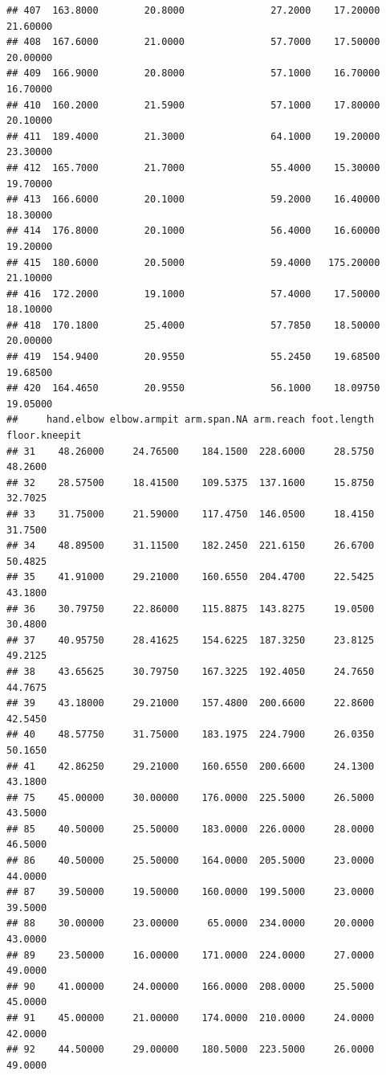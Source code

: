\documentclass[]{article}
\begin{document}
\begin{verbatim}
## 407  163.8000        20.8000               27.2000    17.20000   21.60000
## 408  167.6000        21.0000               57.7000    17.50000   20.00000
## 409  166.9000        20.8000               57.1000    16.70000   16.70000
## 410  160.2000        21.5900               57.1000    17.80000   20.10000
## 411  189.4000        21.3000               64.1000    19.20000   23.30000
## 412  165.7000        21.7000               55.4000    15.30000   19.70000
## 413  166.6000        20.1000               59.2000    16.40000   18.30000
## 414  176.8000        20.1000               56.4000    16.60000   19.20000
## 415  180.6000        20.5000               59.4000   175.20000   21.10000
## 416  172.2000        19.1000               57.4000    17.50000   18.10000
## 418  170.1800        25.4000               57.7850    18.50000   20.00000
## 419  154.9400        20.9550               55.2450    19.68500   19.68500
## 420  164.4650        20.9550               56.1000    18.09750   19.05000
##     hand.elbow elbow.armpit arm.span.NA arm.reach foot.length floor.kneepit
## 31    48.26000     24.76500    184.1500  228.6000     28.5750       48.2600
## 32    28.57500     18.41500    109.5375  137.1600     15.8750       32.7025
## 33    31.75000     21.59000    117.4750  146.0500     18.4150       31.7500
## 34    48.89500     31.11500    182.2450  221.6150     26.6700       50.4825
## 35    41.91000     29.21000    160.6550  204.4700     22.5425       43.1800
## 36    30.79750     22.86000    115.8875  143.8275     19.0500       30.4800
## 37    40.95750     28.41625    154.6225  187.3250     23.8125       49.2125
## 38    43.65625     30.79750    167.3225  192.4050     24.7650       44.7675
## 39    43.18000     29.21000    157.4800  200.6600     22.8600       42.5450
## 40    48.57750     31.75000    183.1975  224.7900     26.0350       50.1650
## 41    42.86250     29.21000    160.6550  200.6600     24.1300       43.1800
## 75    45.00000     30.00000    176.0000  225.5000     26.5000       43.5000
## 85    40.50000     25.50000    183.0000  226.0000     28.0000       46.5000
## 86    40.50000     25.50000    164.0000  205.5000     23.0000       44.0000
## 87    39.50000     19.50000    160.0000  199.5000     23.0000       39.5000
## 88    30.00000     23.00000     65.0000  234.0000     20.0000       43.0000
## 89    23.50000     16.00000    171.0000  224.0000     27.0000       49.0000
## 90    41.00000     24.00000    166.0000  208.0000     25.5000       45.0000
## 91    45.00000     21.00000    174.0000  210.0000     24.0000       42.0000
## 92    44.50000     29.00000    180.5000  223.5000     26.0000       49.0000

\end{verbatim}
\end{document}
